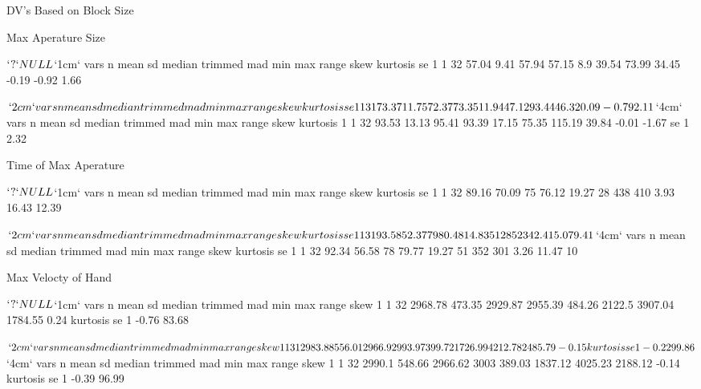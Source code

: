 \documentclass{article}
\begin{document}
\newpage

\normalsize
\bf
\centerline{DV's Based on Block Size}
\small
Max Aperature Size
\begin{Schunk}
\begin{Soutput}
$`?`
NULL

$`1cm`
  vars  n  mean   sd median trimmed mad   min   max range  skew kurtosis   se
1    1 32 57.04 9.41  57.94   57.15 8.9 39.54 73.99 34.45 -0.19    -0.92 1.66

$`2cm`
  vars  n  mean    sd median trimmed   mad   min   max range skew kurtosis   se
1    1 31 73.37 11.75  72.37   73.35 11.94 47.12 93.44 46.32 0.09    -0.79 2.11

$`4cm`
  vars  n  mean    sd median trimmed   mad   min    max range  skew kurtosis
1    1 32 93.53 13.13  95.41   93.39 17.15 75.35 115.19 39.84 -0.01    -1.67
    se
1 2.32
\end{Soutput}
\end{Schunk}

Time of Max Aperature
\begin{Schunk}
\begin{Soutput}
$`?`
NULL

$`1cm`
  vars  n  mean    sd median trimmed   mad min max range skew kurtosis    se
1    1 32 89.16 70.09     75   76.12 19.27  28 438   410 3.93    16.43 12.39

$`2cm`
  vars  n  mean    sd median trimmed   mad min max range skew kurtosis   se
1    1 31 93.58 52.37     79   80.48 14.83  51 285   234 2.41     5.07 9.41

$`4cm`
  vars  n  mean    sd median trimmed   mad min max range skew kurtosis se
1    1 32 92.34 56.58     78   79.77 19.27  51 352   301 3.26    11.47 10
\end{Soutput}
\end{Schunk}

Max Velocty of Hand
\begin{Schunk}
\begin{Soutput}
$`?`
NULL

$`1cm`
  vars  n    mean     sd  median trimmed    mad    min     max   range skew
1    1 32 2968.78 473.35 2929.87 2955.39 484.26 2122.5 3907.04 1784.55 0.24
  kurtosis    se
1    -0.76 83.68

$`2cm`
  vars  n    mean     sd median trimmed    mad     min     max   range  skew
1    1 31 2983.88 556.01 2966.9 2993.97 399.72 1726.99 4212.78 2485.79 -0.15
  kurtosis    se
1    -0.22 99.86

$`4cm`
  vars  n   mean     sd  median trimmed    mad     min     max   range  skew
1    1 32 2990.1 548.66 2966.62    3003 389.03 1837.12 4025.23 2188.12 -0.14
  kurtosis    se
1    -0.39 96.99
\end{Soutput}
\end{Schunk}
\end{document}
